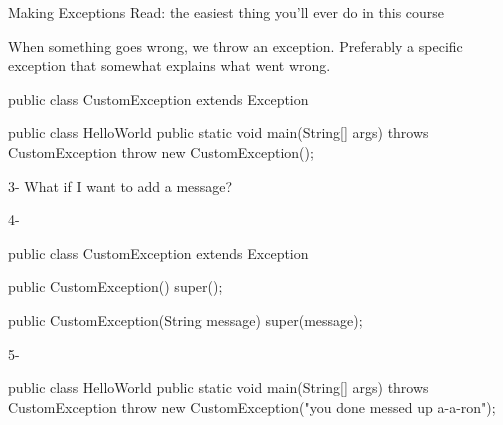 \documentclass[week4]{csse2002}
\begin{document}
\begin{topic}{Making Exceptions}
{\small Read: the easiest thing you'll ever do in this course}
\begin{subtopic}{1}
When something goes wrong, we throw an exception. Preferably a specific exception that somewhat explains what went wrong. 
\end{subtopic}
\begin{java}
public class CustomException extends Exception {}
\end{java}

\begin{subtopic}{2}
\begin{java}
public class HelloWorld {
	public static void main(String[] args) throws CustomException {
		throw new CustomException();
	}
}
\end{java}
\end{subtopic}

\begin{subtopic}{3-}
What if I want to add a message?
\end{subtopic}

\begin{subtopic}{4-}
\begin{java}
public class CustomException extends Exception {
	public CustomException() {
		super();
	}

	public CustomException(String message) {
		super(message);
	}
}
\end{java}
\end{subtopic}

\begin{subtopic}{5-}
\begin{java}
public class HelloWorld {
	public static void main(String[] args) throws CustomException {
		throw new CustomException("you done messed up a-a-ron");
	}
}
\end{java}
\end{subtopic}
\end{topic}
\end{document}
